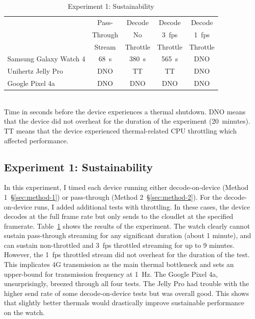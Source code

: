 \begin{table}
\centering
\begin{tabular}{|l|c|c|c|c|}
\hline
    & Pass- & Decode & Decode & Decode \\
    & Through & No & 3~fps & 1~fps \\
    & Stream & Throttle & Throttle & Throttle \\
\hline
Samsung Galaxy Watch 4 & \cellcolor{red!20}68~s & \cellcolor{red!20}380~s & \cellcolor{red!20}565~s & \cellcolor{green!20}DNO \\[0.1cm]
\hline
Unihertz Jelly Pro & \cellcolor{green!20}DNO & \cellcolor{red!20}TT & \cellcolor{red!20}TT & \cellcolor{green!20}DNO  \\[0.1cm]
\hline
Google Pixel 4a & \cellcolor{green!20}DNO & \cellcolor{green!20}DNO & \cellcolor{green!20}DNO & \cellcolor{green!20}DNO \\[0.1cm]
\hline
\end{tabular}
    \begin{captext}
    \\[0.1cm] \small Time in seconds before the device experiences a thermal shutdown. DNO means that the device did not overheat for the duration of the experiment (20~minutes). TT means that the device experienced thermal-related CPU throttling which affected performance.
    \end{captext}
\caption{Experiment 1: Sustainability}
\label{tab:time-before-overheating}
\end{table}

\subsection{Experiment 1: Sustainability}
\label{sec:exp1-sustainability}
In this experiment, I timed each device running either decode-on-device (Method 1~\S\ref{sec:method-1}) or pass-through (Method 2~\S\ref{sec:method-2}). For the decode-on-device runs, I added additional tests with throttling. In these cases, the device decodes at the full frame rate but only sends to the cloudlet at the specified framerate. Table~\ref{tab:time-before-overheating} shows the results of the experiment. The watch clearly cannot sustain pass-through streaming for any significant duration (about 1 minute), and can sustain non-throttled and 3~fps throttled streaming for up to 9 minutes.  However, the 1~fps throttled stream did not overheat for the duration of the test. This implicates 4G transmission as the main thermal bottleneck and sets an upper-bound for transmission frequency at 1~Hz. The Google Pixel 4a, unsurprisingly, breezed through all four tests. The Jelly Pro had trouble with the higher send rate of some decode-on-device tests but was overall good. This shows that slightly better thermals would drastically improve sustainable performance on the watch. 


